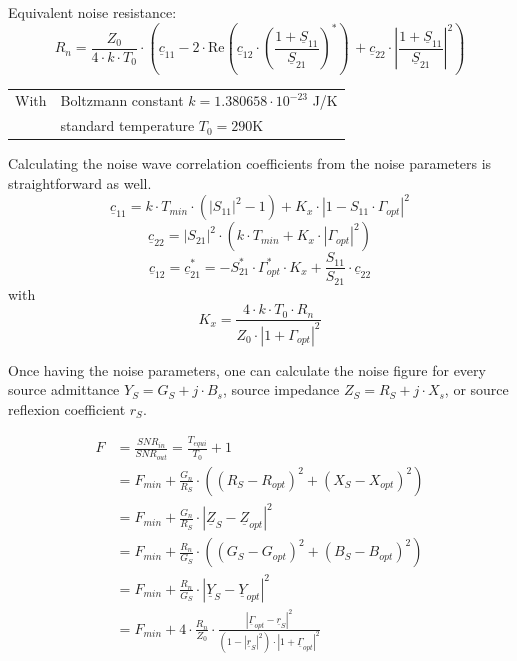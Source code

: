 \documentclass[10pt]{report}
\begin{document}
\addvspace{12pt}

Equivalent noise resistance:
\begin{equation}
R_n = \frac{Z_0}{4\cdot k\cdot T_0}\cdot
      \left( \underline{c}_{11} - 2\cdot
      \text{Re}\left( \underline{c}_{12}\cdot\left( \frac{1+\underline{S}_{11}}{\underline{S}_{21}} \right)^*
      \right)\, + \underline{c}_{22}\cdot
      \left| \frac{1+\underline{S}_{11}}{\underline{S}_{21}} \right|^2 \right)
\label{eqn:nparamRn}
\end{equation}
\begin{tabular}{ll}
With & \quad Boltzmann constant $k = 1.380658\cdot 10^{-23}$ J/K\\
     & \quad standard temperature $T_0 = 290$K\\
\end{tabular}

\addvspace{12pt}

Calculating the noise wave correlation coefficients from the noise
parameters is straightforward as well.
\begin{equation}
\underline{c}_{11} = k\cdot T_{min}\cdot (|S_{11}|^2-1) + K_x\cdot |1-S_{11}\cdot\Gamma_{opt}|^2
\end{equation}
\begin{equation}
\underline{c}_{22} = |S_{21}|^2\cdot\left( k\cdot T_{min} + K_x\cdot|\Gamma_{opt}|^2 \right)
\end{equation}
\begin{equation}
\underline{c}_{12} =
\underline{c}_{21}^* = -S_{21}^*\cdot\Gamma_{opt}^*\cdot K_x + \frac{S_{11}}{S_{21}}\cdot\underline{c}_{22}
\end{equation}
with
\begin{equation}
K_x = \frac{4\cdot k\cdot T_0\cdot R_n}{Z_0\cdot|1+\Gamma_{opt}|^2}
\end{equation}


Once having the noise parameters, one can calculate the noise figure for
every source admittance $Y_S=G_S+j\cdot B_s$, source impedance
$Z_S=R_S+j\cdot X_s$, or source reflexion coefficient $r_S$.

\begin{align}
  F & = \frac{SNR_{in}}{SNR_{out}} = \frac{T_{equi}}{T_0} + 1\\
    & = F_{min} + \frac{G_n}{R_S}\cdot\left( (R_S-R_{opt})^2 + (X_S-X_{opt})^2 \right)\\
    & = F_{min} + \frac{G_n}{R_S}\cdot\left| \underline{Z}_S - \underline{Z}_{opt} \right| ^2\\
    & = F_{min} + \frac{R_n}{G_S}\cdot\left( (G_S-G_{opt})^2 + (B_S-B_{opt})^2 \right)\\
    & = F_{min} + \frac{R_n}{G_S}\cdot\left| \underline{Y}_S - \underline{Y}_{opt} \right| ^2\\
    & = F_{min} + 4\cdot\frac{R_n}{Z_0}\cdot\frac{\left| \underline{\Gamma}_{opt}-\underline{r}_S\right| ^2}
                  {\left( 1-|\underline{r}_S|^2\right)\cdot\left| 1+\underline{\Gamma}_{opt}\right| ^2}
\end{align}
\end{document}
